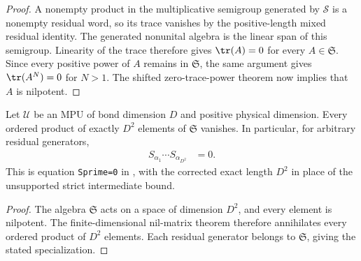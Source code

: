 \begin{proof}\leanok
    A nonempty product in the multiplicative semigroup generated by
    $\mathcal S$ is a nonempty residual word, so its trace vanishes by the
    positive-length mixed residual identity.  The generated nonunital algebra
    is the linear span of this semigroup.  Linearity of the trace therefore
    gives $\tr(A)=0$ for every $A\in\mathfrak S$.  Since every positive power
    of $A$ remains in $\mathfrak S$, the same argument gives
    $\tr(A^N)=0$ for $N>1$.  The shifted zero-trace-power theorem now implies
    that $A$ is nilpotent.
\end{proof}

\begin{lemma}
    \label{thm:mpu_residual_product_d_sq}
    \leanok
    Let $\mathcal U$ be an MPU of bond dimension $D$ and positive physical
    dimension.  Every ordered product of exactly $D^2$ elements of
    $\mathfrak S$ vanishes.  In particular, for arbitrary residual generators,
    \begin{align}
        S_{\alpha_1}\cdots S_{\alpha_{D^2}} & =0.
    \end{align}
    This is equation \texttt{Sprime=0} in
    \cite[Proposition~III.3(ii)]{Cirac2017MPU}, with the corrected exact length
    $D^2$ in place of the unsupported strict intermediate bound.
\end{lemma}

\begin{proof}\leanok
    The algebra $\mathfrak S$ acts on a space of dimension $D^2$, and every
    element is nilpotent.  The finite-dimensional nil-matrix theorem therefore
    annihilates every ordered product of $D^2$ elements.  Each residual
    generator belongs to $\mathfrak S$, giving the stated specialization.
\end{proof}

